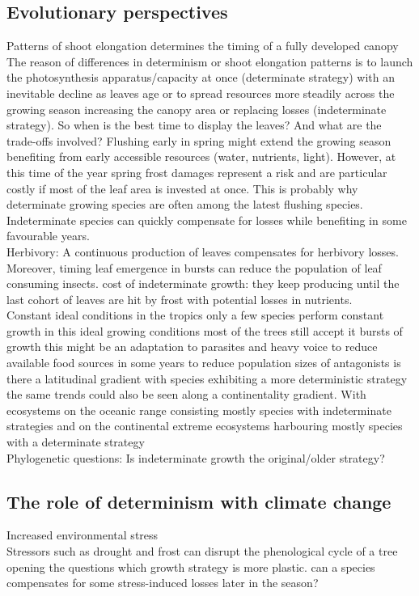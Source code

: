 \documentclass{article}
\begin{document}
\subsection*{Evolutionary perspectives}
Patterns of shoot elongation determines the timing of a fully developed canopy\\
The reason of differences in determinism or shoot elongation patterns is to launch the photosynthesis apparatus/capacity at once (determinate strategy) with an inevitable decline as leaves age or to spread resources more steadily across the growing season increasing the canopy area or replacing losses (indeterminate strategy). So when is the best time to display the leaves? And what are the trade-offs involved? Flushing early in spring might extend the growing season benefiting from early accessible resources (water, nutrients, light). However, at this time of the year spring frost damages represent a risk and are particular costly if most of the leaf area is invested at once. This is probably why determinate growing species are often among the latest flushing species. Indeterminate species can quickly compensate for losses while benefiting in some favourable years. \\

Herbivory: A continuous production of leaves compensates for herbivory losses. Moreover, timing leaf emergence in bursts can reduce the population of leaf consuming insects.
cost of indeterminate growth: they keep producing until the last cohort of leaves are hit by frost with potential losses in nutrients. \\
Constant ideal conditions in the tropics only a few species perform constant growth in this ideal growing conditions most of the trees still accept it bursts of growth this might be an adaptation to parasites and heavy voice to reduce available food sources in some years to reduce population sizes of antagonists is there a latitudinal gradient with species exhibiting a more deterministic strategy the same trends could also be seen along a continentality gradient. With ecosystems on the oceanic range consisting mostly species with indeterminate strategies and on the continental extreme ecosystems harbouring mostly species with a determinate strategy\\

Phylogenetic questions: Is indeterminate growth the original/older strategy?\\

\subsection*{The role of determinism with climate change}
Increased environmental stress\\
Stressors such as drought and frost can disrupt the phenological cycle of a tree opening the questions which growth strategy is more plastic. can a species compensates for some stress-induced losses later in the season?\\
\end{document}
